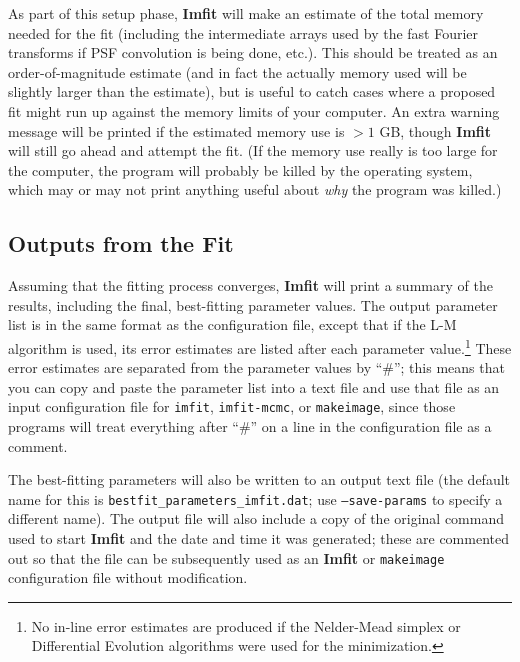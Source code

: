 \documentclass[10pt,a4paper,article]{memoir}
\newcommand{\imfit}{\textbf{Imfit}}
\newcommand{\imfitprog}{\texttt{imfit}}
\newcommand{\imfitmcmc}{\texttt{imfit-mcmc}}
\newcommand{\makeimage}{\texttt{makeimage}}
\begin{document}
As part of this setup phase, \imfit{} will make an estimate of the total
memory needed for the fit (including the intermediate arrays used by the
fast Fourier transforms if PSF convolution is being done, etc.). This
should be treated as an order-of-magnitude estimate (and in fact the
actually memory used will be slightly larger than the estimate), but is
useful to catch cases where a proposed fit might run up against the
memory limits of your computer. An extra warning message will be printed
if the estimated memory use is $> 1$ GB, though \imfit{} will still go
ahead and attempt the fit. (If the memory use really is too large for
the computer, the program will probably be killed by the operating
system, which may or may not print anything useful about \textit{why}
the program was killed.)


\subsection{Outputs from the Fit}

Assuming that the fitting process converges, \imfit{} will print a
summary of the results, including the final, best-fitting parameter
values. The output parameter list is in the same format as the
configuration file, except that if the L-M algorithm is used, its error
estimates are listed after each parameter value.\footnote{No in-line
error estimates are produced if the Nelder-Mead simplex or Differential
Evolution algorithms were used for the minimization.} These error
estimates are separated from the parameter values by ``\#''; this means
that you can copy and paste the parameter list into a text file and use
that file as an input configuration file for \imfitprog, \imfitmcmc, or
\makeimage, since those programs will treat everything after ``\#'' on a
line in the configuration file as a comment. 

The best-fitting parameters will also be written to an output text file
(the default name for this is \texttt{bestfit\_parameters\_imfit.dat};
use \texttt{--save-params} to specify a different name). The output file
will also include a copy of the original command used to start \imfit{}
and the date and time it was generated; these are commented out so that
the file can be subsequently used as an \imfit{} or \makeimage{}
configuration file without modification.
\end{document}
